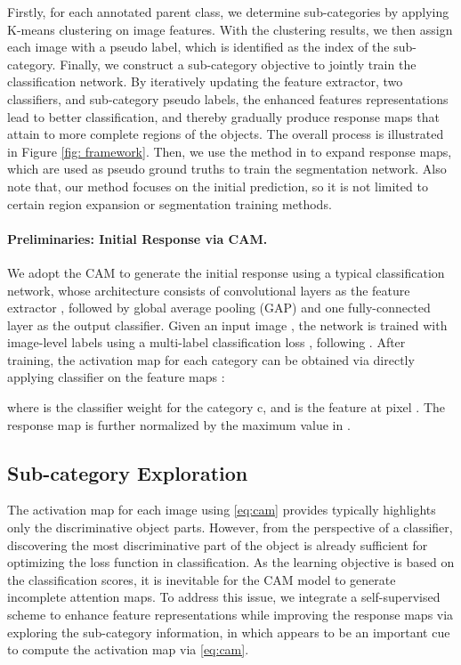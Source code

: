 \documentclass[10pt,twocolumn,letterpaper]{article}
\begin{document}
Firstly, for each annotated parent class, we determine  sub-categories by applying K-means clustering on image features.
With the clustering results, we then assign each image with a pseudo label, which is identified as the index of the sub-category. Finally, we construct a sub-category objective to jointly train the classification network.
By iteratively updating the feature extractor, two classifiers, and sub-category pseudo labels, the enhanced features representations lead to better classification, and thereby gradually produce response maps that attain to more complete regions of the objects. 
The overall process is illustrated in Figure \ref{fig: framework}.
Then, we use the method in \cite{ahn2018learning} to expand response maps, which are used as pseudo ground truths to train the segmentation network.
Also note that, our method focuses on the initial prediction, so it is not limited to certain region expansion or segmentation training methods.


\paragraph{Preliminaries: Initial Response via CAM.}
We adopt the CAM to generate the initial response using a typical classification network, whose architecture consists of convolutional layers as the feature extractor , followed by global average pooling (GAP) and one fully-connected layer  as the output classifier.
Given an input image , the network is trained with image-level labels  using a multi-label classification loss , following \cite{zhou2016learning}.
After training, the activation map  for each category  can be obtained via directly applying classifier  on the feature maps :

where  is the classifier weight for the category c, and  is the feature at pixel . The response map is further normalized by the maximum value in .





\subsection{Sub-category Exploration}
The activation map for each image using \eqref{eq:cam} provides typically highlights only the discriminative object parts.
However, from the perspective of a classifier, discovering the most discriminative part of the object is already sufficient for optimizing the loss function  in classification.
As the learning objective is based on the classification scores, it is inevitable for the CAM model to generate 
incomplete attention maps.
To address this issue, we integrate a self-supervised scheme to enhance feature representations  while improving the response maps via exploring the sub-category information, in which  appears to be an important cue to compute the activation map via \eqref{eq:cam}.
\end{document}
